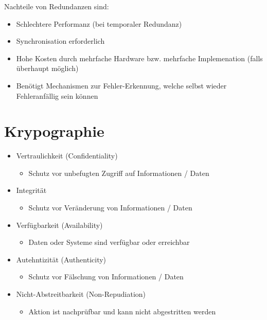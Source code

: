\documentclass[a4paper,12pt]{article}
\begin{document}
Nachteile von Redundanzen sind:
\begin{itemize}
\item Schlechtere Performanz (bei temporaler Redundanz)
\item Synchronisation erforderlich
\item Hohe Kosten durch mehrfache Hardware bzw. mehrfache Implemenation (falls überhaupt möglich)
\item Benötigt Mechanismen zur Fehler-Erkennung, welche selbst wieder Fehleranfällig sein können
\end{itemize}

\section{Krypographie}
\begin{itemize}
\item Vertraulichkeit (Confidentiality)
	\begin{itemize}
	\item Schutz vor unbefugten Zugriff auf Informationen / Daten
	\end{itemize}
\item Integrität
	\begin{itemize}
	\item Schutz vor Veränderung von Informationen / Daten
	\end{itemize}
\item Verfügbarkeit (Availability)
	\begin{itemize}
	\item Daten oder Systeme sind verfügbar oder erreichbar
	\end{itemize}
\item Autehntizität (Authenticity)
	\begin{itemize}
	\item Schutz vor Fälschung von Informationen / Daten
	\end{itemize}
\item Nicht-Abstreitbarkeit (Non-Repudiation)
	\begin{itemize}
	\item Aktion ist nachprüfbar und kann nicht abgestritten werden
	\end{itemize}
\end{itemize}
\end{document}
